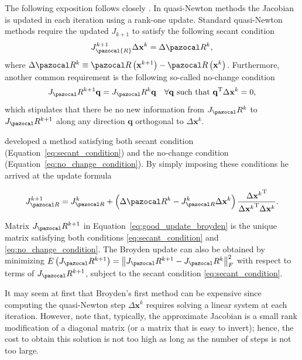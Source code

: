 The following exposition follows closely \cite{fang_two_2009}.
In quasi-Newton methods the Jacobian is updated in each iteration using a rank-one update.
Standard quasi-Newton methods require the updated \(J_{k+1}\) to satisfy the following secant condition
\begin{equation} \label{eq:secant_condition}
J_\pazocal{R}^{k+1} \Delta \mathbf x^{k}=\Delta \pazocal R^{k},
\end{equation}
where \(\Delta \pazocal R^{k}\equiv \pazocal R\left(\mathbf x^{k+1}\right)-\pazocal R\left(\mathbf x^ {k}\right)\).
Furthermore, another common requirement is the following so-called no-change condition
\begin{equation} \label{eq:no_change_condition}
J_\pazocal R^{k+1} \mathbf q=J_\pazocal R^{k} \mathbf q \quad \forall \mathbf q \text { such that } \mathbf q^{\mathrm{T}} \Delta \mathbf x^{k}=0,
\end{equation}
which stipulates that there be no new information from \(J_\pazocal R^{k}\) to \(J_\pazocal R^{k+1}\) along any direction \(\mathbf q\) orthogonal to \(\Delta \mathbf x^{k}\).

\cite{broyden} developed a method satisfying both secant condition (Equation~\eqref{eq:secant_condition}) and the no-change condition (Equation~\eqref{eq:no_change_condition}).
By simply imposing these conditions he arrived at the update formula
\begin{highlight}
\begin{equation} \label{eq:good_update_broyden}
J_{\pazocal R}^{k+1}=J_{\pazocal R}^{k}+\left(\Delta \pazocal R^{k}-J_{\pazocal R}^{k} \Delta \mathbf x^{k}\right) \frac{\Delta {\mathbf x^{k}}^{\mathrm{T}}}{\Delta {\mathbf x^{k}}^{\mathrm{T}} \Delta \mathbf x^{k}}.
\end{equation}
\end{highlight}

Matrix \(J_\pazocal R^{k+1}\) in Equation~\eqref{eq:good_update_broyden} is the unique matrix satisfying both conditions \eqref{eq:secant_condition} and \eqref{eq:no_change_condition}.
The Broyden update can also be obtained by minimizing \(E\left(J_\pazocal R^{k+1}\right)=\left\|J_\pazocal R^{k+1}-J_\pazocal R^{k}\right\|_{F}^{2}\) with respect to terms of \(J_\pazocal R^{k+1}\), subject to the secant condition \eqref{eq:secant_condition}.

It may seem at first that Broyden's first method can be expensive since computing the quasi-Newton step \(\Delta \mathbf x^{k}\) requires solving a linear system at each iteration.
However, note that, typically, the approximate Jacobian is a small rank modification of a diagonal matrix (or a matrix that is easy to invert); hence, the cost to obtain this solution is not too high as long as the number of steps is not too large.

